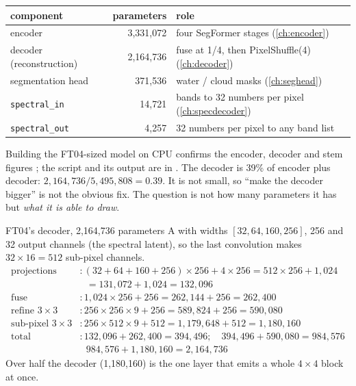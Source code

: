 \begin{center}
\begin{tabular}{lrl}
\toprule
component & parameters & role\\
\midrule
encoder & 3,331,072 & four SegFormer stages (\cref{ch:encoder})\\
decoder (reconstruction) & 2,164,736 & fuse at 1/4, then PixelShuffle(4) (\cref{ch:decoder})\\
segmentation head & 371,536 & water / cloud masks (\cref{ch:seghead})\\
\texttt{spectral\_in} & 14,721 & bands to 32 numbers per pixel (\cref{ch:specdecoder})\\
\texttt{spectral\_out} & 4,257 & 32 numbers per pixel to any band list\\
\bottomrule
\end{tabular}
\end{center}
Building the FT04-sized model on CPU confirms the encoder, decoder and stem figures \tagC; the script
and its output are in . The decoder is 39\% of encoder plus decoder:
$2{,}164{,}736/5{,}495{,}808=0.39$. It is not small, so ``make the decoder bigger'' is not the obvious fix. The
question is not how many parameters it has but \emph{what it is able to draw}.

\begin{worked}[label={we:decoderwork:ft04dec}]{FT04's decoder, 2,164,736 parameters}
A  with widths $[32,64,160,256]$,  256 and 32 output channels (the
spectral latent), so the last convolution makes $32\times16=512$ sub-pixel channels.
\begin{align*}
\text{projections} &: (32+64+160+256)\times256 + 4\times256 = 512\times256+1{,}024\\
&\phantom{:}\ = 131{,}072+1{,}024 = 132{,}096\\
\text{fuse} &: 1{,}024\times256+256 = 262{,}144+256 = 262{,}400\\
\text{refine }3\times3 &: 256\times256\times9+256 = 589{,}824+256 = 590{,}080\\
\text{sub-pixel }3\times3 &: 256\times512\times9+512 = 1{,}179{,}648+512 = 1{,}180{,}160\\
\text{total} &: 132{,}096+262{,}400 = 394{,}496;\quad 394{,}496+590{,}080 = 984{,}576\\
&\phantom{:}\ 984{,}576+1{,}180{,}160 = 2{,}164{,}736
\end{align*}
Over half the decoder (1,180,160) is the one layer that emits a whole $4\times4$ block at once.
\end{worked}

